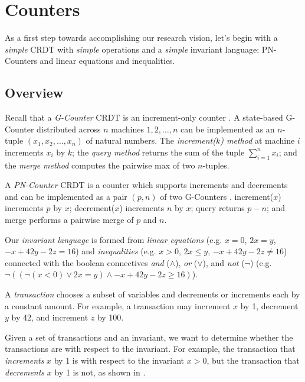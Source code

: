 \section{Counters}
As a first step towards accomplishing our research vision, let's begin with a
\emph{simple} CRDT with \emph{simple} operations and a \emph{simple} invariant
language: PN-Counters and linear equations and inequalities.

\subsection{Overview}\label{sec:counter-overview}
Recall that a \emph{G-Counter} CRDT is an increment-only counter
\cite{shapiro2011comprehensive}. A state-based G-Counter distributed across $n$
machines $1, 2, \ldots, n$ can be implemented as an $n$-tuple $(x_1, x_2,
\ldots, x_n)$ of natural numbers. The \emph{increment($k$) method} at machine
$i$ increments $x_i$ by $k$; the \emph{query method} returns the sum of the
tuple $\sum_{i=1}^n x_i$; and the \emph{merge method} computes the pairwise max
of two $n$-tuples.

A \emph{PN-Counter} CRDT is a counter which supports increments and decrements
and can be implemented as a pair $(p, n)$ of two G-Counters
\cite{shapiro2011comprehensive}. increment($x$) increments $p$ by $x$;
decrement($x$) increments $n$ by $x$; query returns $p - n$; and merge performs
a pairwise merge of $p$ and $n$.

Our \emph{invariant language} is formed from \emph{linear equations} (e.g. $x =
0$, $2x = y$, $-x + 42y - 2z = 16$) and \emph{inequalities} (e.g. $x > 0$, $2x
\leq y$, $-x + 42y - 2z \neq 16$) connected with the boolean connectives
\emph{and} ($\land$), \emph{or} ($\lor$), and \emph{not} ($\lnot$) (e.g.
$\lnot((\lnot(x < 0) \lor 2x = y) \land -x + 42y - 2z \geq 16)$).

A \emph{transaction} chooses a subset of variables and decrements or increments
each by a constant amount. For example, a transaction may increment $x$ by 1,
decrement $y$ by 42, and increment $z$ by 100.

Given a set of transactions and an invariant, we want to determine whether the
transactions are \iconfluent{} with respect to the invariant. For example, the
transaction that \emph{increments} $x$ by 1 is \iconfluent{} with respect to
the invariant $x > 0$, but the transaction that \emph{decrements} $x$ by 1 is
not, as shown in .

